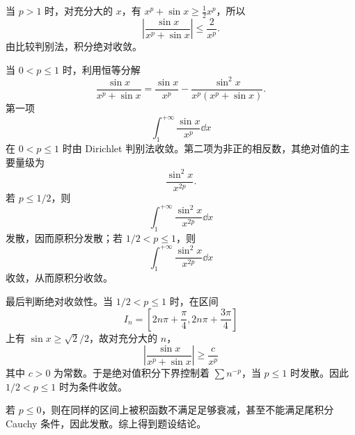 \begin{solution}
	当 $p>1$ 时，对充分大的 $x$，有 $x^p+\sin x\geq \frac12x^p$，所以
	\[
	\left|\frac{\sin x}{x^p+\sin x}\right|\leq \frac2{x^p}.
	\]
	由比较判别法，积分绝对收敛。
	
	当 $0<p\leq1$ 时，利用恒等分解
	\[
	\frac{\sin x}{x^p+\sin x}
	=\frac{\sin x}{x^p}-\frac{\sin^2x}{x^p(x^p+\sin x)}.
	\]
	第一项
	\[
	\int_1^{+\infty}\frac{\sin x}{x^p}\dd x
	\]
	在 $0<p\leq1$ 时由 Dirichlet 判别法收敛。第二项为非正的相反数，其绝对值的主要量级为
	\[
	\frac{\sin^2x}{x^{2p}}.
	\]
	若 $p\leq1/2$，则
	\[
	\int_1^{+\infty}\frac{\sin^2x}{x^{2p}}\dd x
	\]
	发散，因而原积分发散；若 $1/2<p\leq1$，则
	\[
	\int_1^{+\infty}\frac{\sin^2x}{x^{2p}}\dd x
	\]
	收敛，从而原积分收敛。
	
	最后判断绝对收敛性。当 $1/2<p\leq1$ 时，在区间
	\[
	I_n=\left[2n\pi+\frac\pi4,2n\pi+\frac{3\pi}4\right]
	\]
	上有 $\sin x\geq\sqrt2/2$，故对充分大的 $n$，
	\[
	\left|\frac{\sin x}{x^p+\sin x}\right|
	\geq \frac{c}{x^p}
	\]
	其中 $c>0$ 为常数。于是绝对值积分下界控制着 $\sum n^{-p}$，当 $p\leq1$ 时发散。因此 $1/2<p\leq1$ 时为条件收敛。
	
	若 $p\leq0$，则在同样的区间上被积函数不满足足够衰减，甚至不能满足尾积分 Cauchy 条件，因此发散。综上得到题设结论。
\end{solution}













